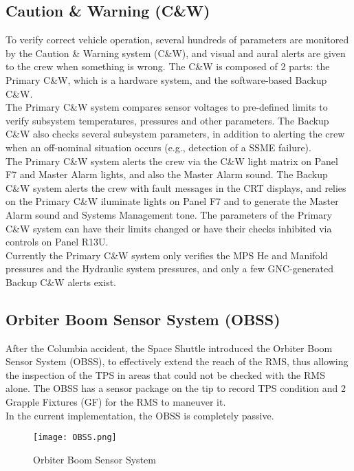\documentclass[Space_Shuttle_Vessel_Manual.tex]{subfiles}
\begin{document}
\begin{multicols*}{2}
\subsection{Caution \& Warning (C\&W)}
To verify correct vehicle operation, several hundreds of parameters are monitored by the Caution \& Warning system (C\&W), and visual and aural alerts are given to the crew when something is wrong. The C\&W is composed of 2 parts: the Primary C\&W, which is a hardware system, and the software-based Backup C\&W.\\
The Primary C\&W system compares sensor voltages to pre-defined limits to verify subsystem temperatures, pressures and other parameters. The Backup C\&W also checks several subsystem parameters, in addition to alerting the crew when an off-nominal situation occurs (e.g., detection of a SSME failure).\\
The Primary C\&W system alerts the crew via the C\&W light matrix on Panel F7 and Master Alarm lights, and also the Master Alarm sound. The Backup C\&W system alerts the crew with fault messages in the CRT displays, and relies on the Primary C\&W iluminate lights on Panel F7 and to generate the Master Alarm sound and Systems Management tone. The parameters of the Primary C\&W system can have their limits changed or have their checks inhibited via controls on Panel R13U.\\
Currently the Primary C\&W system only verifies the MPS He and Manifold pressures and the Hydraulic system pressures, and only a few GNC-generated Backup C\&W alerts exist.
\end{multicols*}



\begin{multicols*}{2}
\subsection{Orbiter Boom Sensor System (OBSS)}
After the Columbia accident, the Space Shuttle introduced the Orbiter Boom Sensor System (OBSS), to effectively extend the reach of the RMS, thus allowing the inspection of the TPS in areas that could not be checked with the RMS alone.
The OBSS has a sensor package on the tip to record TPS condition and 2 Grapple Fixtures (GF) for the RMS to maneuver it.\\
In the current implementation, the OBSS is completely passive.
\begin{figure}[H]
  \texttt{[image: OBSS.png]}
  \caption{Orbiter Boom Sensor System}
  \label{fig:OBSS}
\end{figure}
\end{multicols*}
\end{document}
